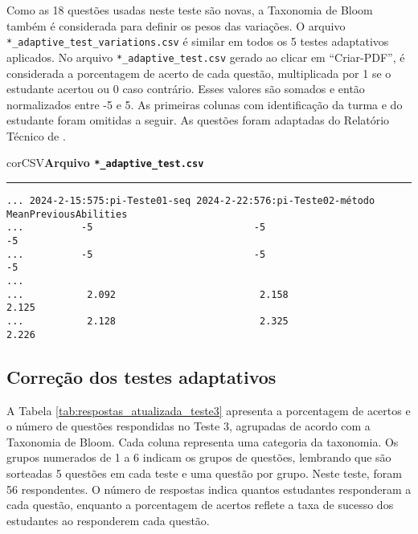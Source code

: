 Como as 18 questões usadas neste teste são novas, a Taxonomia de Bloom também é considerada para definir os pesos das variações. O arquivo \texttt{*\_adaptive\_test\_variations.csv} é similar em todos os 5 testes adaptativos aplicados. No arquivo \texttt{*\_adaptive\_test.csv} gerado ao clicar em ``Criar-PDF'', é considerada a porcentagem de acerto de cada questão, multiplicada por 1 se o estudante acertou ou 0 caso contrário. Esses valores são somados e então normalizados entre -5 e 5. As primeiras colunas com identificação da turma e do estudante foram omitidas a seguir. As questões foram adaptadas do Relatório Técnico de .

\begin{myboxCode}{corCSV}{\textbf{Arquivo \texttt{*\_adaptive\_test.csv}}}\vspace{3mm}
\hrule
\begin{verbatim}
... 2024-2-15:575:pi-Teste01-seq 2024-2-22:576:pi-Teste02-método MeanPreviousAbilities
...          -5                            -5                           -5
...          -5                            -5                           -5
... 
...           2.092                         2.158                        2.125
...           2.128                         2.325                        2.226
\end{verbatim}
\end{myboxCode}

\subsection{Correção dos testes adaptativos}

A Tabela \ref{tab:respostas_atualizada_teste3} apresenta a porcentagem de acertos e o número de questões respondidas no Teste 3, agrupadas de acordo com a Taxonomia de Bloom. Cada coluna representa uma categoria da taxonomia. Os grupos numerados de 1 a 6 indicam os grupos de questões, lembrando que são sorteadas 5 questões em cada teste e uma questão por grupo. Neste teste, foram 56 respondentes. O número de respostas indica quantos estudantes responderam a cada questão, enquanto a porcentagem de acertos reflete a taxa de sucesso dos estudantes ao responderem cada questão.

